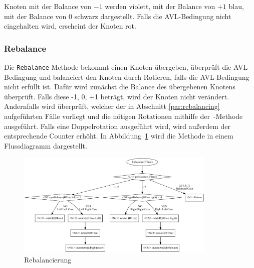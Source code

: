 Knoten mit der Balance von \(-1\) werden violett, mit der Balance von \(+1\)
blau, mit der Balance von \(0\) schwarz dargestellt.
Falls die AVL-Bedingung nicht eingehalten wird, erscheint der Knoten rot.

\subsubsection{Rebalance}\label{par:MethodRebalance}
Die \verb|Rebalance|-Methode bekommt einen Knoten übergeben, überprüft die AVL-Bedingung und
balanciert den Knoten durch Rotieren, falls die AVL-Bedingung nicht erfüllt ist.
Dafür wird zunächst die Balance des übergebenen Knotens überprüft.
Falls diese -1, 0, +1 beträgt, wird der Knoten nicht verändert.
Andernfalls wird überprüft, welcher der in Abschnitt \ref{par:rebalancing} aufgeführten Fälle
vorliegt und die nötigen Rotationen mithilfe der~-Methode ausgeführt.
Falls eine Doppelrotation ausgeführt wird, wird außerdem der entsprechende Counter erhöht.
In Abbildung~\ref{fig:rebalance} wird die Methode in einem Flussdiagramm dargestellt.
\begin{figure}[p]
    \centering
    \includegraphics[width = 0.85\textwidth]{img/gv/rebalance}
    \caption{Rebalancierung}
    \label{fig:rebalance}
\end{figure}

